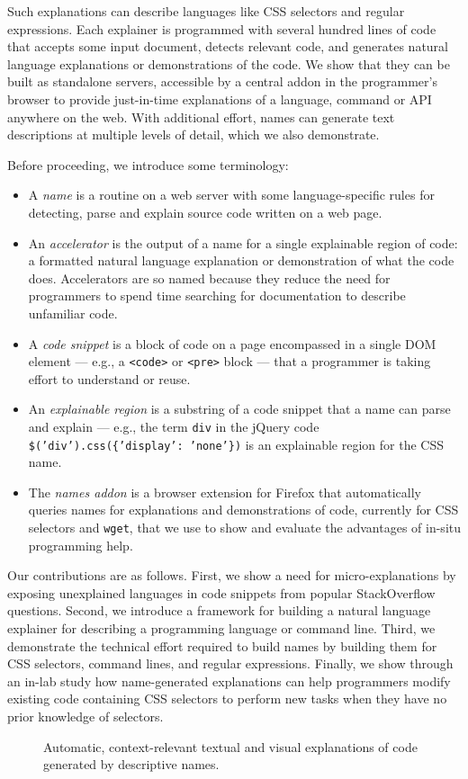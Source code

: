 Such explanations can describe languages like CSS selectors and regular expressions.
Each explainer is programmed with several hundred lines of code that accepts some input document, detects relevant code, and generates natural language explanations or demonstrations of the code.
We show that they can be built as standalone servers, accessible by a central addon in the programmer's browser to provide just-in-time explanations of a language, command or API anywhere on the web.
With additional effort, \glspl{name} can generate text descriptions at multiple levels of detail, which we also demonstrate.

Before proceeding, we introduce some terminology:
\begin{itemize}
\item A \emph{\gls{name}} is a routine on a web server with some language-specific rules for detecting, parse and explain source code written on a web page.
\item An \emph{accelerator} is the output of a \gls{name} for a single explainable region of code: a formatted natural language explanation or demonstration of what the code does.  Accelerators are so named because they reduce the need for programmers to spend time searching for documentation to describe unfamiliar code.
\item A \emph{code snippet} is a block of code on a page encompassed in a single DOM element --- e.g., a \texttt{<code>} or \texttt{<pre>} block --- that a programmer is taking effort to understand or reuse.
\item An \emph{explainable region} is a substring of a code snippet that a \gls{name} can parse and explain --- e.g., the term \texttt{div} in the jQuery code \texttt{\$('div').css(\{'display': 'none'\})} is an explainable region for the CSS \gls{name}.
\item The \emph{\Glspl{name} addon} is a browser extension for Firefox that automatically queries \glspl{name} for explanations and demonstrations of code, currently for CSS selectors and \texttt{wget}, that we use to show and evaluate the advantages of in-situ programming help.
\end{itemize}

Our contributions are as follows.
First, we show a need for micro-explanations by exposing unexplained languages in code snippets from popular StackOverflow questions.
Second, we introduce a framework for building a natural language explainer for describing a programming language or command line.
Third, we demonstrate the technical effort required to build \glspl{name} by building them for CSS selectors, command lines, and regular expressions.
Finally, we show through an in-lab study how \gls{name}-generated explanations can help programmers modify existing code containing CSS selectors to perform new tasks when they have no prior knowledge of selectors. 

\begin{figure}[!t]
    \centering
    \label{fig:tutorons}
    \caption{Automatic, context-relevant textual and visual explanations of code generated by descriptive \glspl{name}.}
\end{figure}

